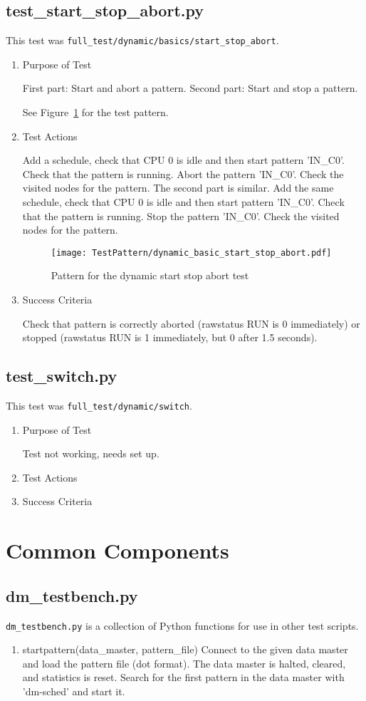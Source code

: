 \documentclass[12pt,a4paper]{report}
\begin{document}
\section{test\_start\_stop\_abort.py}
This test was \texttt{full\_test/dynamic/basics/start\_stop\_abort}.
\begin{enumerate}
	\item Purpose of Test

    First part: Start and abort a pattern. Second part: Start and stop a pattern.

	See Figure~\ref{fig:Pattern_for_the_dynamic_start_stop_abort_test} for the test pattern.
	\item Test Actions

    Add a schedule, check that CPU 0 is idle and then start pattern 'IN\_C0'. Check that the pattern is running.
    Abort the pattern 'IN\_C0'. Check the visited nodes for the pattern. The second part is similar.
    Add the same schedule, check that CPU 0 is idle and then start pattern 'IN\_C0'. Check that the pattern is running.
    Stop the pattern 'IN\_C0'. Check the visited nodes for the pattern.
    \begin{figure}
        \centering
        \texttt{[image: TestPattern/dynamic\_basic\_start\_stop\_abort.pdf]}
        \caption{Pattern for the dynamic start stop abort test}
        \label{fig:Pattern_for_the_dynamic_start_stop_abort_test}
    \end{figure}
	\item Success Criteria

	Check that pattern is correctly aborted (rawstatus RUN is 0 immediately) or
	stopped (rawstatus RUN is 1 immediately, but 0 after 1.5 seconds).
\end{enumerate}
\section{test\_switch.py}
This test was \texttt{full\_test/dynamic/switch}.
\begin{enumerate}
	\item Purpose of Test

	Test not working, needs set up.
	\item Test Actions
	\item Success Criteria
\end{enumerate}
\chapter{Common Components}
\section{dm\_testbench.py}
\texttt{dm\_testbench.py} is a collection of Python functions for use in other test scripts.
\begin{enumerate}
\item startpattern(data\_master, pattern\_file)
    Connect to the given data master and load the pattern file (dot format).
    The data master is halted, cleared, and statistics is reset.
    Search for the first pattern in the data master with 'dm-sched' and start it.
\end{enumerate}
\end{document}

